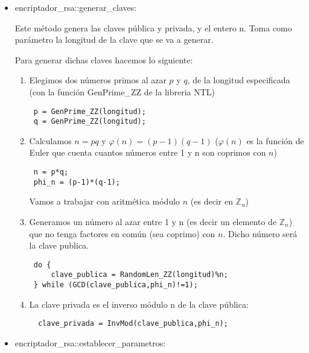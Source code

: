 \documentclass[spanish]{article}
\begin{document}
\begin{itemize}

\item encriptador\_rsa::generar\_claves:

Este método genera las claves pública y privada, y el entero n. 
Toma como parámetro la longitud de la clave que se va a generar.

Para generar dichas claves hacemos lo siguiente:

\begin{enumerate} 

\item Elegimos dos números primos al azar $p$ y $q$, de la longitud especificada 
(con la función GenPrime\_ZZ de la libreria NTL)

\begin{verbatim}
 p = GenPrime_ZZ(longitud);
 q = GenPrime_ZZ(longitud);
\end{verbatim}

\item Calculamos $n=pq$ y $\varphi(n)=(p-1)(q-1)$ ($\varphi(n)$ es la función
de Euler que cuenta cuantos números entre 1 y n son coprimos con $n$)

\begin{verbatim}
 n = p*q;
 phi_n = (p-1)*(q-1);
\end{verbatim} 

Vamos a trabajar con aritmética módulo $n$ (es decir en $\mathbb{Z}_n$)

\item Generamos un número al azar entre 1 y n (es decir un elemento de
$\mathbb{Z}_n$) que no tenga factores en común (sea coprimo) con $n$. 
Dicho número será la clave publica.

\begin{verbatim}
 do {
	 clave_publica = RandomLen_ZZ(longitud)%n;
 } while (GCD(clave_publica,phi_n)!=1);
\end{verbatim}

\item La clave privada es el inverso módulo n de la clave pública:

\begin{verbatim}
  clave_privada = InvMod(clave_publica,phi_n);  
\end{verbatim}

\end{enumerate}

\item encriptador\_rsa::establecer\_parametros:


\end{itemize}
\end{document}
